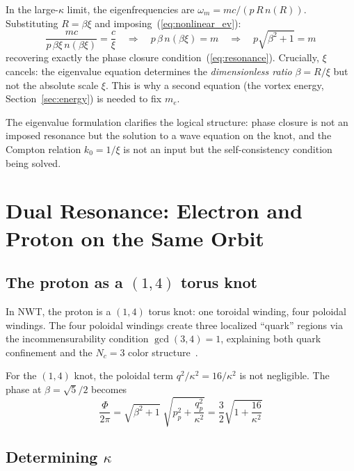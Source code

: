 \documentclass[11pt,a4paper]{article}
\begin{document}
In the large-$\kappa$ limit, the eigenfrequencies are
$\omega_m = mc/(p\,R\,n(R))$.  Substituting $R = \beta\xi$ and
imposing~(\ref{eq:nonlinear_ev}):
\begin{equation}
  \frac{mc}{p\,\beta\xi\,n(\beta\xi)} = \frac{c}{\xi}
  \quad\Longrightarrow\quad
  p\,\beta\,n(\beta\xi) = m
  \quad\Longrightarrow\quad
  p\sqrt{\beta^2 + 1} = m
  \label{eq:ev_reduces}
\end{equation}
recovering exactly the phase closure condition~(\ref{eq:resonance}).
Crucially, $\xi$ cancels: the eigenvalue equation determines the
\emph{dimensionless ratio} $\beta = R/\xi$ but not the absolute
scale $\xi$.  This is why a second equation (the vortex energy,
Section~\ref{sec:energy}) is needed to fix $m_e$.

The eigenvalue formulation clarifies the logical structure:
phase closure is not an imposed resonance but the solution to
a wave equation on the knot, and the Compton relation
$k_0 = 1/\xi$ is not an input but the self-consistency condition
being solved.


\section{Dual Resonance: Electron and Proton on the Same Orbit}
\label{sec:dual}

\subsection{The proton as a $(1,4)$ torus knot}

In NWT, the proton is a $(1,4)$ torus knot: one toroidal winding,
four poloidal windings.  The four poloidal windings create three
localized ``quark'' regions via the incommensurability condition
$\gcd(3, 4) = 1$, explaining both quark confinement and the
$N_c = 3$ color structure~\cite{paper4}.

For the $(1,4)$ knot, the poloidal term $q^2/\kappa^2 = 16/\kappa^2$
is not negligible.  The phase at $\beta = \sqrt{5}/2$ becomes
\begin{equation}
  \frac{\Phi}{2\pi} = \sqrt{\beta^2 + 1}\;\sqrt{p_p^2 + \frac{q_p^2}{\kappa^2}}
  = \frac{3}{2}\sqrt{1 + \frac{16}{\kappa^2}}
  \label{eq:proton_phase}
\end{equation}

\subsection{Determining $\kappa$}
\end{document}
